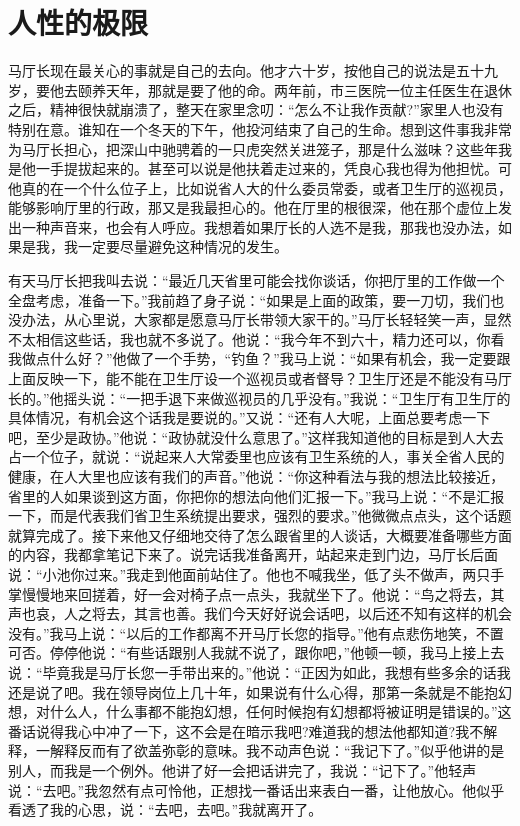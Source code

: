 \documentclass[12pt,oneside]{book}
\begin{document}
\chapter{人性的极限}

马厅长现在最关心的事就是自己的去向。他才六十岁，按他自己的说法是五十九岁，要他去颐养天年，那就是要了他的命。两年前，市三医院一位主任医生在退休之后，精神很快就崩溃了，整天在家里念叨：``怎么不让我作贡献?''家里人也没有特别在意。谁知在一个冬天的下午，他投河结束了自己的生命。想到这件事我非常为马厅长担心，把深山中驰骋着的一只虎突然关进笼子，那是什么滋味？这些年我是他一手提拔起来的。甚至可以说是他扶着走过来的，凭良心我也得为他担忧。可他真的在一个什么位子上，比如说省人大的什么委员常委，或者卫生厅的巡视员，能够影响厅里的行政，那又是我最担心的。他在厅里的根很深，他在那个虚位上发出一种声音来，也会有人呼应。我想着如果厅长的人选不是我，那我也没办法，如果是我，我一定要尽量避免这种情况的发生。

有天马厅长把我叫去说：``最近几天省里可能会找你谈话，你把厅里的工作做一个全盘考虑，准备一下。''我前趋了身子说：``如果是上面的政策，要一刀切，我们也没办法，从心里说，大家都是愿意马厅长带领大家干的。''马厅长轻轻笑一声，显然不太相信这些话，我也就不多说了。他说：``我今年不到六十，精力还可以，你看我做点什么好？''他做了一个手势，``钓鱼？''我马上说：``如果有机会，我一定要跟上面反映一下，能不能在卫生厅设一个巡视员或者督导？卫生厅还是不能没有马厅长的。''他摇头说：``一把手退下来做巡视员的几乎没有。''我说：``卫生厅有卫生厅的具体情况，有机会这个话我是要说的。''又说：``还有人大呢，上面总要考虑一下吧，至少是政协。''他说：``政协就没什么意思了。''这样我知道他的目标是到人大去占一个位子，就说：``说起来人大常委里也应该有卫生系统的人，事关全省人民的健康，在人大里也应该有我们的声音。''他说：``你这种看法与我的想法比较接近，省里的人如果谈到这方面，你把你的想法向他们汇报一下。''我马上说：``不是汇报一下，而是代表我们省卫生系统提出要求，强烈的要求。''他微微点点头，这个话题就算完成了。接下来他又仔细地交待了怎么跟省里的人谈话，大概要准备哪些方面的内容，我都拿笔记下来了。说完话我准备离开，站起来走到门边，马厅长后面说：``小池你过来。''我走到他面前站住了。他也不喊我坐，低了头不做声，两只手掌慢慢地来回搓着，好一会对椅子点一点头，我就坐下了。他说：``鸟之将去，其声也哀，人之将去，其言也善。我们今天好好说会话吧，以后还不知有这样的机会没有。''我马上说：``以后的工作都离不开马厅长您的指导。''他有点悲伤地笑，不置可否。停停他说：``有些话跟别人我就不说了，跟你吧，''他顿一顿，我马上接上去说：``毕竟我是马厅长您一手带出来的。''他说：``正因为如此，我想有些多余的话我还是说了吧。我在领导岗位上几十年，如果说有什么心得，那第一条就是不能抱幻想，对什么人，什么事都不能抱幻想，任何时候抱有幻想都将被证明是错误的。''这番话说得我心中冲了一下，这不会是在暗示我吧?难道我的想法他都知道?我不解释，一解释反而有了欲盖弥彰的意味。我不动声色说：``我记下了。''似乎他讲的是别人，而我是一个例外。他讲了好一会把话讲完了，我说：``记下了。''他轻声说：``去吧。''我忽然有点可怜他，正想找一番话出来表白一番，让他放心。他似乎看透了我的心思，说：``去吧，去吧。''我就离开了。
\end{document}
